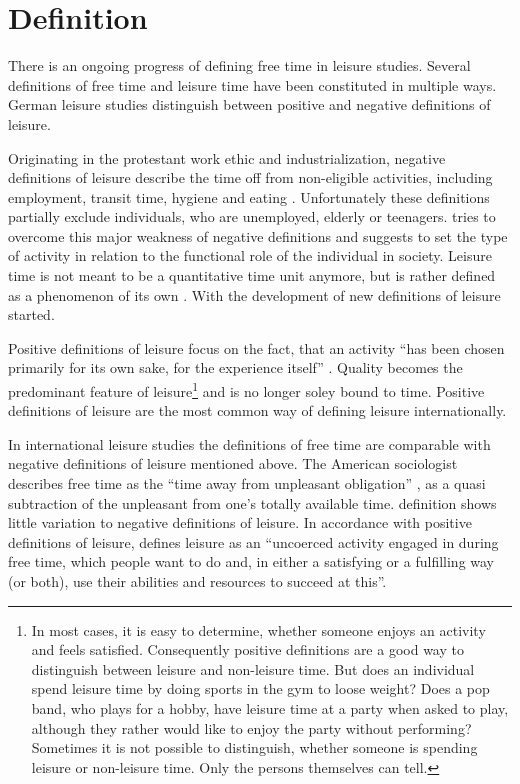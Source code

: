 \documentclass[12pt,numbers=noenddot,parskip,bibliography=totocnumbered,listof=totocnumbered,draft]{scrreprt}
\begin{document}
\section{Definition}

There is an ongoing progress of defining free time in leisure studies. Several definitions of free time and leisure time have been constituted in multiple ways. German leisure studies distinguish between positive and negative definitions of leisure. 

Originating in the protestant work ethic \citep[p.27]{weber2006} and industrialization, negative definitions of leisure describe the time off from non-eligible activities, including employment, transit time, hygiene and eating \citep[p.137]{prahl2002}. Unfortunately these definitions partially exclude individuals, who are unemployed, elderly or teenagers. \citeauthor{scheuch1972} tries to overcome this major weakness of negative definitions and suggests to set the type of activity in relation to the functional role of the individual in society. Leisure time is not meant to be a quantitative time unit anymore, but is rather defined as a phenomenon of its own \citep[p.31]{scheuch1972}. With \citeauthor{scheuch1972} the development of new definitions of leisure started.

Positive definitions of leisure focus on the fact, that an activity ``has been chosen primarily for its own sake, for the experience itself'' \citep[p.15]{freysinger2000}. Quality becomes the predominant feature of leisure\footnote{In most cases, it is easy to determine, whether someone enjoys an activity and feels satisfied. Consequently positive definitions are a good way to distinguish between leisure and non-leisure time. But does an individual spend leisure time by doing sports in the gym to loose weight? Does a pop band, who plays for a hobby, have leisure time at a party when asked to play, although they rather would like to enjoy the party without performing? Sometimes it is not possible to distinguish, whether someone is spending leisure or non-leisure time. Only the persons themselves can tell.} and is no longer soley bound to time. Positive definitions of leisure are the most common way of defining leisure internationally.

In international leisure studies the definitions of free time are comparable with negative definitions of leisure mentioned above. The American sociologist \citeauthor{stebbins2007} describes free time as the ``time away from unpleasant obligation'' \cite[p.4]{stebbins2007}, as a quasi subtraction of the unpleasant from one's totally available time. \citeauthor{stebbins2007} definition shows little variation to negative definitions of leisure. In accordance with positive definitions of leisure, \citeauthor{stebbins2007} defines leisure as an ``uncoerced  activity engaged in during free time, which people want to do and, in either a satisfying or a fulfilling way (or both), use their abilities and resources to succeed at this''. 
\end{document}
